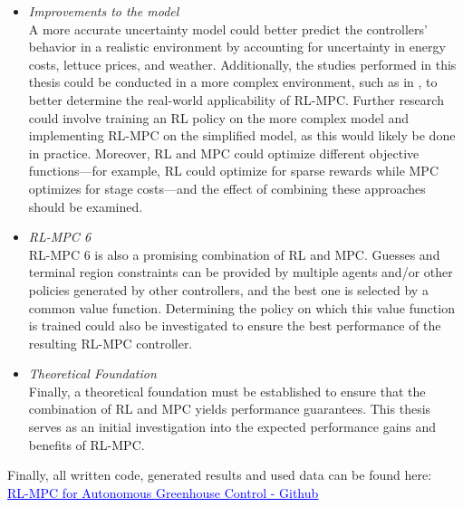 \begin{itemize}
	\item \textit{Improvements to the model}
	\\A more accurate uncertainty model could better predict the controllers' behavior in a realistic environment by accounting for uncertainty in energy costs, lettuce prices, and weather. Additionally, the studies performed in this thesis could be conducted in a more complex environment, such as in \citet{GreenLightOpenSource2020}, to better determine the real-world applicability of RL-MPC. Further research could involve training an RL policy on the more complex model and implementing RL-MPC on the simplified model, as this would likely be done in practice. Moreover, RL and MPC could optimize different objective functions—for example, RL could optimize for sparse rewards while MPC optimizes for stage costs—and the effect of combining these approaches should be examined.
	
	\item \textit{RL-MPC 6}
	\\RL-MPC 6 is also a promising combination of RL and MPC. Guesses and terminal region constraints can be provided by multiple agents and/or other policies generated by other controllers, and the best one is selected by a common value function. Determining the policy on which this value function is trained could also be investigated to ensure the best performance of the resulting RL-MPC controller.
	
	\item \textit{Theoretical Foundation}
	\\Finally, a theoretical foundation must be established to ensure that the combination of RL and MPC yields performance guarantees. This thesis serves as an initial investigation into the expected performance gains and benefits of RL-MPC.
\end{itemize}

Finally, all written code, generated results and used data can be found here:\\
\href{https://github.com/mharraway/RL-MPC-for-autonomous-greenhouse-control}{\textcolor{blue}{\underline{RL-MPC for Autonomous Greenhouse Control - Github}}}







